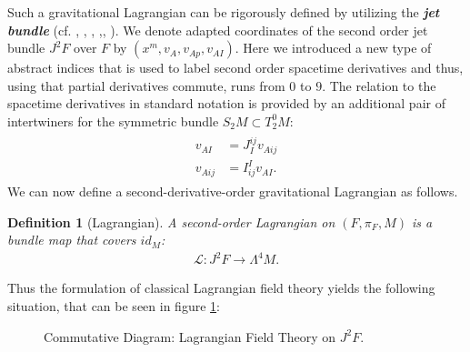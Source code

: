 \documentclass[%
 reprint,
nofootinbib,
 amsmath,amssymb,
 aps,
 prd,
floatfix,
]{revtex4-2}
\newtheorem{definition}{Definition}
\begin{document}
Such a gravitational Lagrangian can be rigorously defined by utilizing the \textit{\textbf{jet bundle}} (cf.  \cite{saunders_1989}, \cite{seiler1994analysis}, \cite{seiler2009involution}, \cite{kolar1993natural},\cite{Gotay1992StressEnergyMomentumTA}, \cite{1998physics...1019G}). 
We denote adapted coordinates of the second order jet bundle $J^2F$ over $F$ by $(x^m, v_A, v_{Ap}, v_{AI})$. Here we introduced a new type of abstract indices that is used to label second order spacetime derivatives and thus, using that partial derivatives commute, runs from $0$ to $9$. 
The relation to the spacetime derivatives in standard notation is provided by an additional pair of intertwiners for the symmetric bundle $S_2M\subset T^0_2M$:
\begin{align}
    \begin{aligned}
        v_{AI} &= J_I^{ij} v_{Aij}\\
    v_{Aij} &= I^I_{ij} v_{AI}.
    \end{aligned}
\end{align}
We can now define a second-derivative-order gravitational Lagrangian as follows.
\begin{definition}[Lagrangian]
A second-order Lagrangian on $(F,\pi_F,M)$ is a bundle map that covers $id_M$:
\begin{align}
    \mathcal{L} : J^2F \longrightarrow \Lambda^4M.
\end{align}
\end{definition}
Thus the formulation of classical Lagrangian field theory yields the following situation, that can be seen in figure \ref{diagram1}:
\begin{figure}[hbt!]
\centering
{}
\caption{Commutative Diagram: Lagrangian Field Theory on $J^2F$.} \label{diagram1}
\end{figure}
\end{document}
